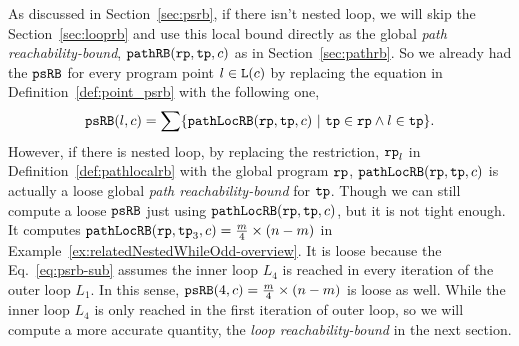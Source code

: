   As discussed in Section~\ref{sec:psrb}, if there isn't nested loop, we will skip the Section~\ref{sec:looprb} and use this local bound directly as the global \emph{path reachability-bound}, $\mathtt{pathRB}(\mathtt{rp}, \mathtt{tp}, c)$ as in Section~\ref{sec:pathrb}.  
  So we already had the $\mathtt{psRB}$ for every program point $l \in \mathtt{L}(c)$ by replacing the equation in Definition~\ref{def:point_psrb} with the following one,
  \begin{equation}
    \label{eq:psrb-sub}
    \psRB(l, c) = 
    \sum
    \left\{ \outinB(\rprog, \tpath, c) ~\vert~ \tpath \in \rprog \land 
    l \in \tpath \right\}.
  \end{equation}
  However, if there is nested loop, 
  by replacing the restriction, $\mathtt{rp}_l$ in Definition~\ref{def:pathlocalrb} with the global program $\mathtt{rp}$, $\mathtt{pathLocRB}(\mathtt{rp}, \mathtt{tp}, c)$ is actually a loose global \emph{path reachability-bound} for $\mathtt{tp}$. Though we can still compute a loose $\mathtt{psRB}$ just using $\mathtt{pathLocRB}(\mathtt{rp}, \mathtt{tp}, c)$, but it is not tight enough. 
It computes
$\mathtt{pathLocRB}(\mathtt{rp}, \mathtt{tp}_3, c) = \frac{m}{4} \times (n - m)$ in Example~\ref{ex:relatedNestedWhileOdd-overview}.
It is loose because the Eq.~\ref{eq:psrb-sub} assumes the inner loop $L_4$ is reached in every iteration of the outer loop $L_1$. In this sense, $\mathtt{psRB}(4, c) = \frac{m}{4} \times (n - m)$ is loose as well.
While the inner loop $L_4$ is only reached in the first iteration of outer loop,
so we will compute a more accurate quantity, the \emph{loop reachability-bound} in the next section.
